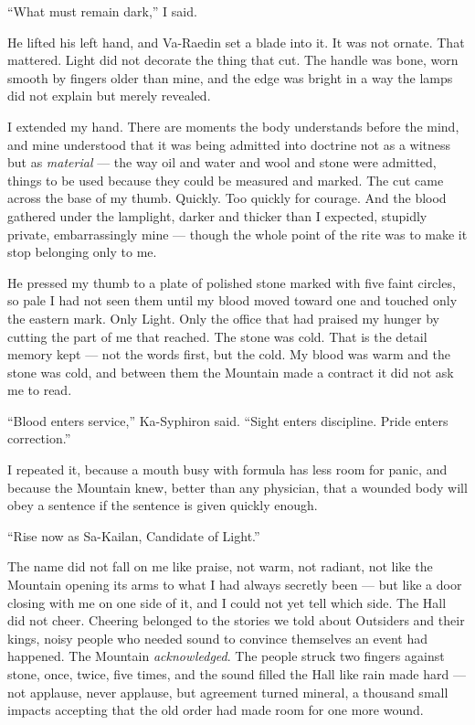 ``What must remain dark,'' I said.\par

He lifted his left hand, and Va-Raedin set a blade into it. It was not ornate. That mattered. Light did not decorate the thing that cut. The handle was bone, worn smooth by fingers older than mine, and the edge was bright in a way the lamps did not explain but merely revealed.\par

I extended my hand. There are moments the body understands before the mind, and mine understood that it was being admitted into doctrine not as a witness but as \textit{material} --- the way oil and water and wool and stone were admitted, things to be used because they could be measured and marked. The cut came across the base of my thumb. Quickly. Too quickly for courage. And the blood gathered under the lamplight, darker and thicker than I expected, stupidly private, embarrassingly mine --- though the whole point of the rite was to make it stop belonging only to me.\par

He pressed my thumb to a plate of polished stone marked with five faint circles, so pale I had not seen them until my blood moved toward one and touched only the eastern mark. Only Light. Only the office that had praised my hunger by cutting the part of me that reached. The stone was cold. That is the detail memory kept --- not the words first, but the cold. My blood was warm and the stone was cold, and between them the Mountain made a contract it did not ask me to read.\par

``Blood enters service,'' Ka-Syphiron said. ``Sight enters discipline. Pride enters correction.''\par

I repeated it, because a mouth busy with formula has less room for panic, and because the Mountain knew, better than any physician, that a wounded body will obey a sentence if the sentence is given quickly enough.\par

``Rise now as Sa-Kailan, Candidate of Light.''\par

The name did not fall on me like praise, not warm, not radiant, not like the Mountain opening its arms to what I had always secretly been --- but like a door closing with me on one side of it, and I could not yet tell which side. The Hall did not cheer. Cheering belonged to the stories we told about Outsiders and their kings, noisy people who needed sound to convince themselves an event had happened. The Mountain \textit{acknowledged}. The people struck two fingers against stone, once, twice, five times, and the sound filled the Hall like rain made hard --- not applause, never applause, but agreement turned mineral, a thousand small impacts accepting that the old order had made room for one more wound.\par

